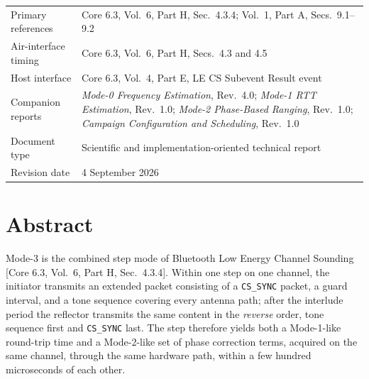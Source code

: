 \documentclass[11pt,a4paper]{article}
\newcommand{\code}[1]{\texttt{\small #1}}
\newcommand{\core}[1]{\textcolor{rulegrey}{\small[Core 6.3, #1]}}
\begin{document}
\vfill
\noindent
\begin{tabular}{@{}L{40mm}L{95mm}@{}}
Primary references & Core 6.3, Vol.\ 6, Part H, Sec.\ 4.3.4; Vol.\ 1, Part A, Secs.\ 9.1--9.2 \\
Air-interface timing & Core 6.3, Vol.\ 6, Part H, Secs.\ 4.3 and 4.5 \\
Host interface & Core 6.3, Vol.\ 4, Part E, LE CS Subevent Result event \\
Companion reports & \emph{Mode-0 Frequency Estimation}, Rev.\ 4.0;
                    \emph{Mode-1 RTT Estimation}, Rev.\ 1.0;
                    \emph{Mode-2 Phase-Based Ranging}, Rev.\ 1.0;
                    \emph{Campaign Configuration and Scheduling}, Rev.\ 1.0 \\
Document type & Scientific and implementation-oriented technical report \\
Revision date & 4 September 2026 \\
\end{tabular}

\newpage
{}

\section*{Abstract}

Mode-3 is the combined step mode of Bluetooth Low Energy Channel Sounding
\core{Vol.\ 6, Part H, Sec.\ 4.3.4}. Within one step on one channel, the initiator transmits an
extended packet consisting of a \code{CS\_SYNC} packet, a guard interval, and a tone sequence
covering every antenna path; after the interlude period the reflector transmits the same content in
the \emph{reverse} order, tone sequence first and \code{CS\_SYNC} last. The step therefore yields
both a Mode-1-like round-trip time and a Mode-2-like set of phase correction terms, acquired on the
same channel, through the same hardware path, within a few hundred microseconds of each other.
\end{document}
